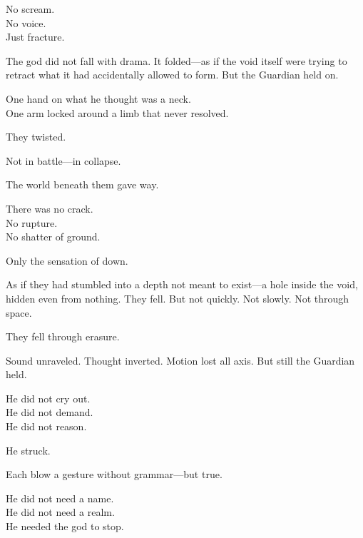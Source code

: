 \documentclass[12pt]{article}
\begin{document}
\vspace{0.5em}
No scream.\\
No voice.\\
Just fracture.

\vspace{0.5em}
The god did not fall with drama. It folded---as if the void itself were trying to retract what it had accidentally allowed to form. But the Guardian held on.

\vspace{0.5em}
One hand on what he thought was a neck.\\
One arm locked around a limb that never resolved.

\vspace{0.5em}
They twisted.

\vspace{0.5em}
Not in battle---in collapse.

\vspace{0.5em}
The world beneath them gave way.

\vspace{0.5em}
There was no crack.\\
No rupture.\\
No shatter of ground.

\vspace{0.5em}
Only the sensation of down.

\vspace{0.5em}
As if they had stumbled into a depth not meant to exist---a hole inside the void, hidden even from nothing. They fell. But not quickly. Not slowly. Not through space.

\vspace{0.5em}
They fell through erasure.

\vspace{0.5em}
Sound unraveled. Thought inverted. Motion lost all axis. But still the Guardian held.

\vspace{0.5em}
He did not cry out.\\
He did not demand.\\
He did not reason.

\vspace{0.5em}
He struck.

\vspace{0.5em}
Each blow a gesture without grammar---but true.

\vspace{0.5em}
He did not need a name.\\
He did not need a realm.\\
He needed the god to stop.
\end{document}
